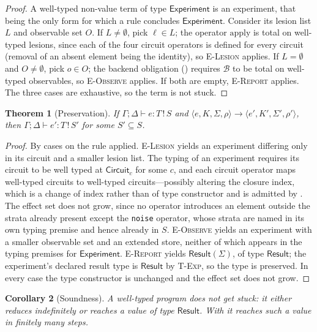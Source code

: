 \documentclass[11pt,twocolumn,a4paper]{article}
\theoremstyle{thmstyle}
\newtheorem{theorem}{Theorem}[section]
\newtheorem{corollary}[theorem]{Corollary}
\theoremstyle{definition}
\theoremstyle{remark}
\newcommand{\Env}{\Gamma}
\newcommand{\store}{\Sigma}
\newcommand{\steps}{\longrightarrow}
\newcommand{\Circ}{\textsf{Circuit}}
\newcommand{\Exp}{\textsf{Experiment}}
\newcommand{\Res}{\textsf{Result}}
\begin{document}
\begin{proof}
A well-typed non-value term of type $\Exp$ is an experiment, that being the
only form for which a rule concludes $\Exp$. Consider its lesion list $L$ and
observable set $O$. If $L\ne\emptyset$, pick $\ell\in L$; the operator
$\mathrm{apply}$ is total on well-typed lesions, since each of the four
circuit operators is defined for every circuit (removal of an absent element
being the identity), so \textsc{E-Lesion} applies. If $L=\emptyset$ and
$O\ne\emptyset$, pick $o\in O$; the backend obligation
() requires $\mathcal{B}$ to be total on well-typed
observables, so \textsc{E-Observe} applies. If both are empty,
\textsc{E-Report} applies. The three cases are exhaustive, so the term is not
stuck.
\end{proof}

\begin{theorem}[Preservation]
\label{thm:preservation}
If $\Env;\Delta\vdash e:T\,!\,S$ and
$\langle e,K,\store,\rho\rangle\steps\langle e',K',\store',\rho'\rangle$, then
$\Env;\Delta\vdash e':T\,!\,S'$ for some $S'\subseteq S$.
\end{theorem}

\begin{proof}
By cases on the rule applied. \textsc{E-Lesion} yields an experiment differing
only in its circuit and a smaller lesion list. The typing of an experiment
requires its circuit to be well typed at $\Circ_{c}$ for some $c$, and each
circuit operator maps well-typed circuits to well-typed circuits---possibly
altering the closure index, which is a change of index rather than of type
constructor and is admitted by . The effect set does not grow,
since no operator introduces an element outside the strata already present
except the \texttt{noise} operator, whose strata are named in its own typing
premise and hence already in $S$. \textsc{E-Observe} yields an experiment with
a smaller observable set and an extended store, neither of which appears in
the typing premises for $\Exp$. \textsc{E-Report} yields $\Res(\store)$, of
type $\Res$; the experiment's declared result type is $\Res$ by
\textsc{T-Exp}, so the type is preserved. In every case the type constructor is
unchanged and the effect set does not grow.
\end{proof}

\begin{corollary}[Soundness]
\label{cor:soundness}
A well-typed program does not get stuck: it either reduces indefinitely or
reaches a value of type $\Res$. With  it reaches such a
value in finitely many steps.
\end{corollary}
\end{document}
